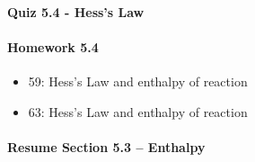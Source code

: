 \documentclass[12pt, openany, letterpaper]{memoir}
\begin{document}
\paragraph*{Quiz 5.4 - Hess's Law}
\paragraph*{Homework 5.4}
\begin{itemize}
  \item 59: Hess's Law and enthalpy of reaction
  \item 63: Hess's Law and enthalpy of reaction
\end{itemize}

\paragraph*{Resume Section 5.3 -- Enthalpy}
\end{document}
